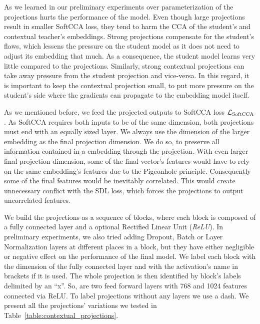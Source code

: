 As we learned in our preliminary experiments over parameterization of the
projections hurts the performance of the model. Even though large projections
result in smaller SoftCCA loss, they tend to harm the CCA of the student's and
contextual teacher's embeddings. Strong projections compensate for the
student's flaws, which lessens the pressure on the student model as it does not
need to adjust its embedding that much. As a consequence, the student model
learns very little compared to the projections. Similarly, strong contextual
projections can take away pressure from the student projection and
vice-versa. In this regard, it is important to keep the contextual projection
small, to put more pressure on the student's side where the gradients can
propagate to the embedding model itself.


As we mentioned before, we feed the projected outputs to SoftCCA loss
$\mathcal{L}_{\text{SoftCCA}}$. As SoftCCA requires both inputs to be of the same
dimension, both projections must end with an equally sized layer. We always use
the dimension of the larger embedding as the final projection dimension. We do
so, to preserve all information contained in a embedding through the
projection. With even larger final projection dimension, some of the final
vector's features would have to rely on the same embedding's features due to
the Pigeonhole principle. Consequently some of the final features would be
inevitably correlated. This would create unnecessary conflict with the SDL
loss, which forces the projections to output uncorrelated features.

We build the projections as a sequence of blocks, where each block is composed
of a fully connected layer and a optional Rectified Linear Unit (\emph{ReLU}).
In preliminary experiments, we also tried adding Dropout, Batch or Layer
Normalization layers at different places in a block, but they have either
negligible or negative effect on the performance of the final model. We label
each block with the dimension of the fully connected layer and with the
activation's name in brackets if it is used. The whole projection is then
identified by block's labels delimited by an ``x''. So, 
are two feed forward layers with 768 and 1024 features connected via ReLU. To
label projections without any layers we use a dash. We present all the
projections' variations we tested in Table~\ref{table:contextual_projections}.


